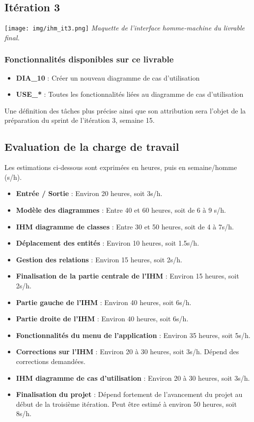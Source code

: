 \documentclass[hidelinks, 10pt,a4paper]{article}
\begin{document}
\subsection{Itération 3}
\begin{center}
  \texttt{[image: img/ihm\_it3.png]}
\textit{Maquette de l'interface homme-machine du livrable final.}
\end{center}

\subsubsection{Fonctionnalités disponibles sur ce livrable}
\begin{itemize}
  \item \textbf{DIA\_10} : Créer un nouveau diagramme de cas d'utilisation
  \item \textbf{USE\_*} : Toutes les fonctionnalités liées au diagramme de cas d'utilisation
\end{itemize}

Une définition des tâches plus précise ainsi que son attribution sera l'objet de la
préparation du sprint de l'itération 3, semaine 15.

\subsection{Evaluation de la charge de travail}

Les estimations ci-dessous sont exprimées en heures, puis en semaine/homme (s/h).
\begin{itemize}
\item \textbf{Entrée / Sortie} : Environ 20 heures, soit 3s/h.
\item \textbf{Modèle des diagrammes} : Entre 40 et 60 heures, soit de 6 à 9 s/h.
\item \textbf{IHM diagramme de classes} : Entre 30 et 50 heures, soit de 4 à 7s/h.
\item \textbf{Déplacement des entités} : Environ 10 heures, soit 1.5s/h.
\item \textbf{Gestion des relations} : Environ 15 heures, soit 2s/h.
\item \textbf{Finalisation de la partie centrale de l'IHM} : Environ 15 heures, soit 2s/h.
\item \textbf{Partie gauche de l'IHM} : Environ 40 heures, soit 6s/h.
\item \textbf{Partie droite de l'IHM} : Environ 40 heures, soit 6s/h.
\item \textbf{Fonctionnalités du menu de l'application} : Environ 35 heures, soit 5s/h.
\item \textbf{Corrections sur l'IHM} : Environ 20 à 30 heures, soit 3s/h.
Dépend des corrections demandées.
\item \textbf{IHM diagramme de cas d'utilisation} : Environ 20 à 30 heures, soit 3s/h.
\item \textbf{Finalisation du projet} : Dépend fortement de l'avancement
du projet au début de la troisième itération. Peut être estimé à environ 50 heures,
soit 8s/h.
\end{itemize}
\end{document}
